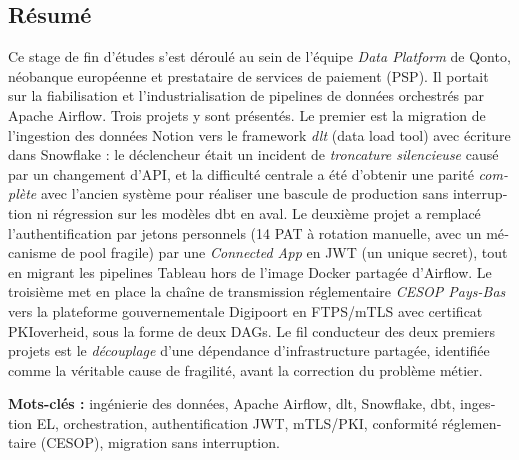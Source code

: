 \clearpage
\begin{french}
\chapter*{Résumé}

Ce stage de fin d'études s'est déroulé au sein de l'équipe \emph{Data Platform} de Qonto, néobanque européenne et prestataire de services de paiement (PSP). Il portait sur la fiabilisation et l'industrialisation de pipelines de données orchestrés par Apache Airflow. Trois projets y sont présentés. Le premier est la migration de l'ingestion des données Notion vers le framework \emph{dlt} (data load tool) avec écriture dans Snowflake : le déclencheur était un incident de \emph{troncature silencieuse} causé par un changement d'API, et la difficulté centrale a été d'obtenir une parité \emph{complète} avec l'ancien système pour réaliser une bascule de production sans interruption ni régression sur les modèles dbt en aval. Le deuxième projet a remplacé l'authentification par jetons personnels (14 PAT à rotation manuelle, avec un mécanisme de pool fragile) par une \emph{Connected App} en JWT (un unique secret), tout en migrant les pipelines Tableau hors de l'image Docker partagée d'Airflow. Le troisième met en place la chaîne de transmission réglementaire \emph{CESOP Pays-Bas} vers la plateforme gouvernementale Digipoort en FTPS/mTLS avec certificat PKIoverheid, sous la forme de deux DAGs. Le fil conducteur des deux premiers projets est le \emph{découplage} d'une dépendance d'infrastructure partagée, identifiée comme la véritable cause de fragilité, avant la correction du problème métier.

\vspace{4pt}
\noindent\textbf{Mots-clés :} ingénierie des données, Apache Airflow, dlt, Snowflake, dbt, ingestion EL, orchestration, authentification JWT, mTLS/PKI, conformité réglementaire (CESOP), migration sans interruption.
\end{french}
